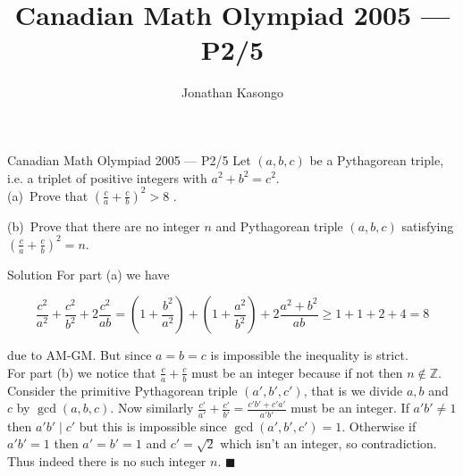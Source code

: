 \documentclass{article}
\author{Jonathan Kasongo}
\title{Canadian Math Olympiad 2005 --- P2/5}
\begin{document}
\maketitle

\begin{problem}{Canadian Math Olympiad 2005 --- P2/5}
Let $(a,b,c)$ be a Pythagorean triple, i.e. a triplet of positive integers
with $a^2 + b^2 = c^2$.\\

(a)\ Prove that $\left( \tfrac ca + \tfrac cb \right) ^2 > 8$ .
\vspace{0.2cm}

(b)\ Prove that there are no integer $n$ and Pythagorean triple $(a,b,c)$ satisfying $\left( \tfrac ca + \tfrac cb \right) ^2 = n$.
\end{problem}

\begin{solution}{Solution}
For part (a) we have

$$
\frac{c^2}{a^2} + \frac{c^2}{b^2} + 2\frac{c^2}{ab} =
\left(1 + \frac{b^2}{a^2}\right) + \left(1 + \frac{a^2}{b^2}\right) +
2\frac{a^2 + b^2}{ab} \geq 1 + 1 + 2 + 4 = 8
$$

due to AM-GM. But since $a=b=c$ is impossible the inequality is strict.\\

For part (b) we notice that $\frac{c}{a} + \frac{c}{b}$ must be an integer
because if not then $n \notin \mathbb{Z}$. Consider the primitive
Pythagorean triple $(a',b',c')$, that is we divide $a, b$ and $c$ by
$\gcd(a,b,c)$. Now similarly $\frac{c'}{a'} + \frac{c'}{b'} =
\frac{c' b' + c' a'}{a'b'}$ must be an integer. If $a'b' \neq 1$ then
$a'b' \mid c'$ but this is impossible since $\gcd(a',b',c')=1$. Otherwise
if $a'b' = 1$ then $a'=b'=1$ and $c' = \sqrt{2}$ which isn't an integer,
so contradiction. Thus indeed there is no such integer $n$.
$\blacksquare$
\end{solution}
\end{document}
